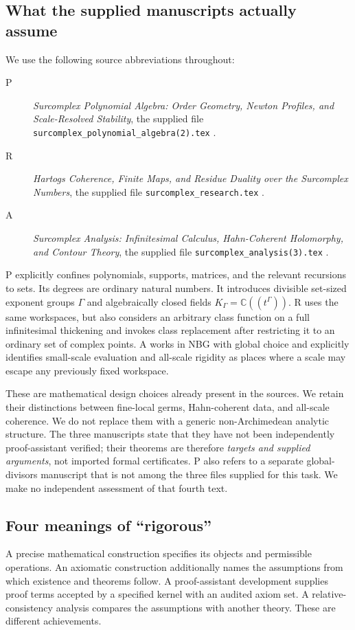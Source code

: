 \documentclass[11pt,letterpaper]{article}
\numberwithin{equation}{section}
\theoremstyle{definition}
\theoremstyle{remark}
\newcommand{\C}{\mathbb C}
\begin{document}
\subsection{What the supplied manuscripts actually assume}
We use the following source abbreviations throughout:
\begin{description}
\item[P] \emph{Surcomplex Polynomial Algebra: Order Geometry, Newton Profiles, and Scale-Resolved Stability}, the supplied file \texttt{surcomplex\_polynomial\_algebra(2).tex} \cite{SourceP}.
\item[R] \emph{Hartogs Coherence, Finite Maps, and Residue Duality over the Surcomplex Numbers}, the supplied file \texttt{surcomplex\_research.tex} \cite{SourceR}.
\item[A] \emph{Surcomplex Analysis: Infinitesimal Calculus, Hahn-Coherent Holomorphy, and Contour Theory}, the supplied file \texttt{surcomplex\_analysis(3).tex} \cite{SourceA}.
\end{description}
P explicitly confines polynomials, supports, matrices, and the relevant recursions to sets. Its degrees are ordinary natural numbers. It introduces divisible set-sized exponent groups $\Gamma$ and algebraically closed fields $K_\Gamma=\C((t^\Gamma))$. R uses the same workspaces, but also considers an arbitrary class function on a full infinitesimal thickening and invokes class replacement after restricting it to an ordinary set of complex points. A works in NBG with global choice and explicitly identifies small-scale evaluation and all-scale rigidity as places where a scale may escape any previously fixed workspace.

These are mathematical design choices already present in the sources. We retain their distinctions between fine-local germs, Hahn-coherent data, and all-scale coherence. We do not replace them with a generic non-Archimedean analytic structure. The three manuscripts state that they have not been independently proof-assistant verified; their theorems are therefore \emph{targets and supplied arguments}, not imported formal certificates. P also refers to a separate global-divisors manuscript that is not among the three files supplied for this task. We make no independent assessment of that fourth text.

\subsection{Four meanings of ``rigorous''}
A precise mathematical construction specifies its objects and permissible operations. An axiomatic construction additionally names the assumptions from which existence and theorems follow. A proof-assistant development supplies proof terms accepted by a specified kernel with an audited axiom set. A relative-consistency analysis compares the assumptions with another theory. These are different achievements.
\end{document}

